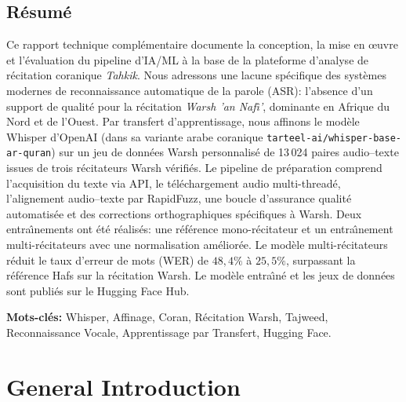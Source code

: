 \documentclass[12pt,a4paper]{report}
\begin{document}
\section*{R\'esum\'e}
Ce rapport technique compl\'ementaire documente la conception, la mise en
{\oe}uvre et l'\'evaluation du pipeline d'IA/ML \`a la base de la plateforme
d'analyse de r\'ecitation coranique \emph{Tahkik}. Nous adressons une lacune
sp\'ecifique des syst\`emes modernes de reconnaissance automatique de la
parole (ASR): l'absence d'un support de qualit\'e pour la r\'ecitation
\textit{Warsh 'an Naf{\^\i}'}, dominante en Afrique du Nord et de l'Ouest.
Par transfert d'apprentissage, nous affinons le mod\`ele Whisper d'OpenAI
(dans sa variante arabe coranique \texttt{tarteel-ai/whisper-base-ar-quran})
sur un jeu de donn\'ees Warsh personnalis\'e de 13{\,}024 paires
audio--texte issues de trois r\'ecitateurs Warsh v\'erifi\'es. Le pipeline
de pr\'eparation comprend l'acquisition du texte via API, le t\'el\'echargement
audio multi-thread\'e, l'alignement audio--texte par RapidFuzz, une boucle
d'assurance qualit\'e automatis\'ee et des corrections orthographiques
sp\'ecifiques \`a Warsh. Deux entra{\^\i}nements ont \'et\'e r\'ealis\'es:
une r\'ef\'erence mono-r\'ecitateur et un entra{\^\i}nement multi-r\'ecitateurs
avec une normalisation am\'elior\'ee. Le mod\`ele multi-r\'ecitateurs r\'eduit
le taux d'erreur de mots (WER) de $48{,}4\%$ \`a $25{,}5\%$, surpassant la
r\'ef\'erence Hafs sur la r\'ecitation Warsh. Le mod\`ele entra{\^\i}n\'e et
les jeux de donn\'ees sont publi\'es sur le Hugging Face Hub.

\textbf{Mots-cl\'es:} Whisper, Affinage, Coran, R\'ecitation Warsh, Tajweed,
Reconnaissance Vocale, Apprentissage par Transfert, Hugging Face.

\newpage

\tableofcontents
\listoffigures
\listoftables
\newpage

\setcounter{page}{1}

\chapter*{General Introduction}
\label{ch:mt_intro}
\end{document}
